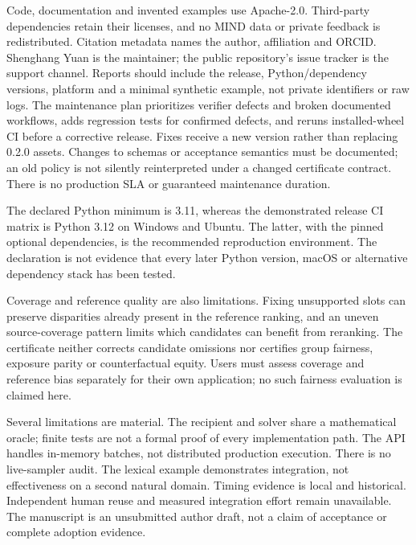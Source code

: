 \documentclass[runningheads]{llncs}
\begin{document}
Code, documentation and invented examples use Apache-2.0. Third-party
dependencies retain their licenses, and no MIND data or private feedback is
redistributed. Citation metadata names the author, affiliation and ORCID.
Shenghang Yuan is the maintainer; the public repository's issue tracker is the
support channel. Reports should include the release, Python/dependency versions,
platform and a minimal synthetic example, not private identifiers or raw logs.
The maintenance plan prioritizes verifier defects and broken documented
workflows, adds regression tests for confirmed defects, and reruns installed-wheel
CI before a corrective release. Fixes receive a new version rather than replacing
0.2.0 assets. Changes to schemas or acceptance semantics must be documented;
an old policy is not silently reinterpreted under a changed certificate contract.
There is no production SLA or guaranteed maintenance duration.

The declared Python minimum is 3.11, whereas the demonstrated release CI matrix
is Python 3.12 on Windows and Ubuntu. The latter, with the pinned optional
dependencies, is the recommended reproduction environment. The declaration is
not evidence that every later Python version, macOS or alternative dependency
stack has been tested.

Coverage and reference quality are also limitations. Fixing unsupported slots
can preserve disparities already present in the reference ranking, and an
uneven source-coverage pattern limits which candidates can benefit from
reranking. The certificate neither corrects candidate omissions nor certifies
group fairness, exposure parity or counterfactual equity. Users must assess
coverage and reference bias separately for their own application; no such
fairness evaluation is claimed here.

Several limitations are material. The recipient and solver share a mathematical
oracle; finite tests are not a formal proof of every implementation path.
The API handles in-memory batches, not distributed production execution.
There is no live-sampler audit. The lexical example demonstrates integration,
not effectiveness on a second natural domain. Timing evidence is local and
historical. Independent human reuse and measured integration effort remain
unavailable. The manuscript is an unsubmitted author draft, not a claim of
acceptance or complete adoption evidence.
\end{document}
